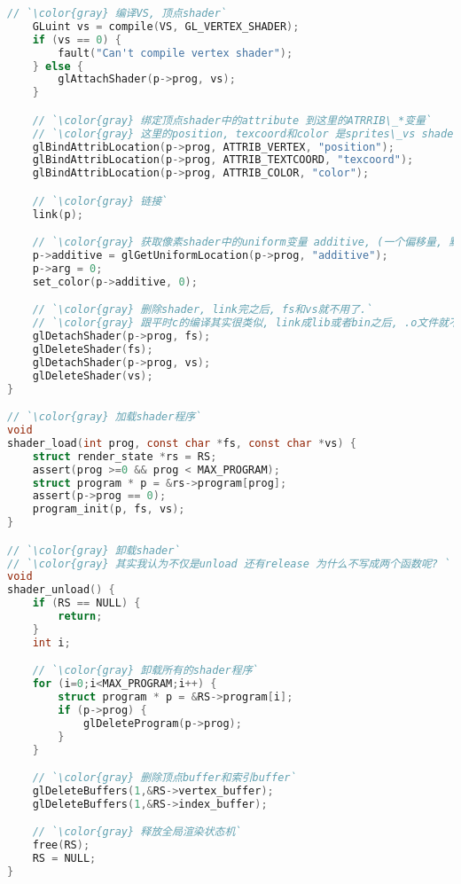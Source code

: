 {\begin{lstlisting}[language=C]
    // `\color{gray} 编译VS, 顶点shader`
    GLuint vs = compile(VS, GL_VERTEX_SHADER);
    if (vs == 0) {
        fault("Can't compile vertex shader");
    } else {
        glAttachShader(p->prog, vs);
    }

    // `\color{gray} 绑定顶点shader中的attribute 到这里的ATRRIB\_*变量`
    // `\color{gray} 这里的position, texcoord和color 是sprites\_vs shader中的attribute`
    glBindAttribLocation(p->prog, ATTRIB_VERTEX, "position");
    glBindAttribLocation(p->prog, ATTRIB_TEXTCOORD, "texcoord");
    glBindAttribLocation(p->prog, ATTRIB_COLOR, "color");

    // `\color{gray} 链接`
    link(p);

    // `\color{gray} 获取像素shader中的uniform变量 additive, (一个偏移量, 默认是0)`
    p->additive = glGetUniformLocation(p->prog, "additive");
    p->arg = 0;
    set_color(p->additive, 0);

    // `\color{gray} 删除shader, link完之后, fs和vs就不用了.`
    // `\color{gray} 跟平时c的编译其实很类似, link成lib或者bin之后, .o文件就不用了.`
    glDetachShader(p->prog, fs);
    glDeleteShader(fs);
    glDetachShader(p->prog, vs);
    glDeleteShader(vs);
}

// `\color{gray} 加载shader程序`
void
shader_load(int prog, const char *fs, const char *vs) {
    struct render_state *rs = RS;
    assert(prog >=0 && prog < MAX_PROGRAM);
    struct program * p = &rs->program[prog];
    assert(p->prog == 0);
    program_init(p, fs, vs);
}

// `\color{gray} 卸载shader`
// `\color{gray} 其实我认为不仅是unload 还有release 为什么不写成两个函数呢? `
void
shader_unload() {
    if (RS == NULL) {
        return;
    }
    int i;

    // `\color{gray} 卸载所有的shader程序`
    for (i=0;i<MAX_PROGRAM;i++) {
        struct program * p = &RS->program[i];
        if (p->prog) {
            glDeleteProgram(p->prog);
        }
    }

    // `\color{gray} 删除顶点buffer和索引buffer`
    glDeleteBuffers(1,&RS->vertex_buffer);
    glDeleteBuffers(1,&RS->index_buffer);

    // `\color{gray} 释放全局渲染状态机`
    free(RS);
    RS = NULL;
}

\end{lstlisting}
}

